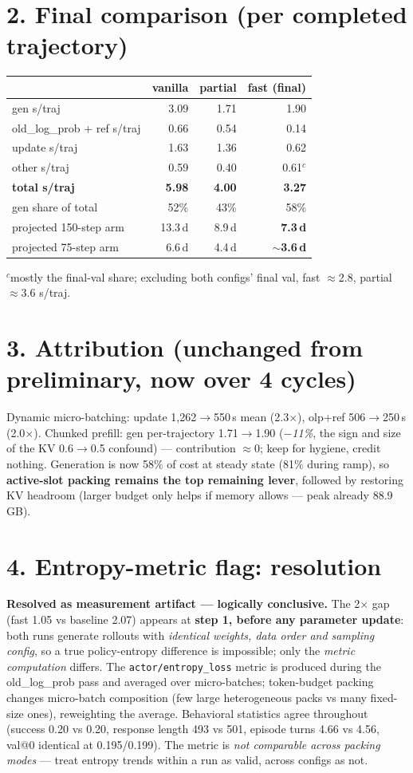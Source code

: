 \documentclass[10pt]{article}
\newcommand{\code}[1]{\texttt{\small #1}}
\newcommand{\flag}[1]{\textcolor{red!70!black}{\textbf{#1}}}
\begin{document}
\section*{2. Final comparison (per completed trajectory)}
\small
\begin{tabular}{lrrr}
\toprule
 & vanilla & partial & \textbf{fast (final)}\\
\midrule
gen s/traj & 3.09 & 1.71 & 1.90\\
old\_log\_prob + ref s/traj & 0.66 & 0.54 & 0.14\\
update s/traj & 1.63 & 1.36 & 0.62\\
other s/traj & 0.59 & 0.40 & 0.61$^c$\\
\textbf{total s/traj} & \textbf{5.98} & \textbf{4.00} & \textbf{3.27}\\
gen share of total & 52\% & 43\% & 58\%\\
projected 150-step arm & 13.3\,d & 8.9\,d & \textbf{7.3\,d}\\
projected 75-step arm & 6.6\,d & 4.4\,d & \textbf{$\sim$3.6\,d}\\
\bottomrule
\end{tabular}
\normalsize

\noindent$^c$mostly the final-val share; excluding both configs' final val, fast $\approx$2.8,
partial $\approx$3.6 s/traj.

\section*{3. Attribution (unchanged from preliminary, now over 4 cycles)}
Dynamic micro-batching: update 1{,}262$\to$550\,s mean (2.3$\times$), olp+ref 506$\to$250\,s
(2.0$\times$). Chunked prefill: gen per-trajectory 1.71$\to$1.90 (\emph{$-$11\%}, the sign
and size of the KV 0.6$\to$0.5 confound) --- contribution $\approx$0; keep for hygiene,
credit nothing. Generation is now 58\% of cost at steady state (81\% during ramp), so
\textbf{active-slot packing remains the top remaining lever}, followed by restoring KV
headroom (larger budget only helps if memory allows --- peak already 88.9\,GB).

\section*{4. Entropy-metric flag: resolution}
\flag{Resolved as measurement artifact --- logically conclusive.} The 2$\times$ gap
(fast 1.05 vs baseline 2.07) appears at \textbf{step 1, before any parameter update}: both
runs generate rollouts with \emph{identical weights, data order and sampling config}, so a
true policy-entropy difference is impossible; only the \emph{metric computation} differs.
The \code{actor/entropy\_loss} metric is produced during the old\_log\_prob pass and
averaged over micro-batches; token-budget packing changes micro-batch composition (few
large heterogeneous packs vs many fixed-size ones), reweighting the average. Behavioral
statistics agree throughout (success 0.20 vs 0.20, response length 493 vs 501, episode
turns 4.66 vs 4.56, val@0 identical at 0.195/0.199). The metric is \emph{not comparable
across packing modes} --- treat entropy trends within a run as valid, across configs as not.
\end{document}

